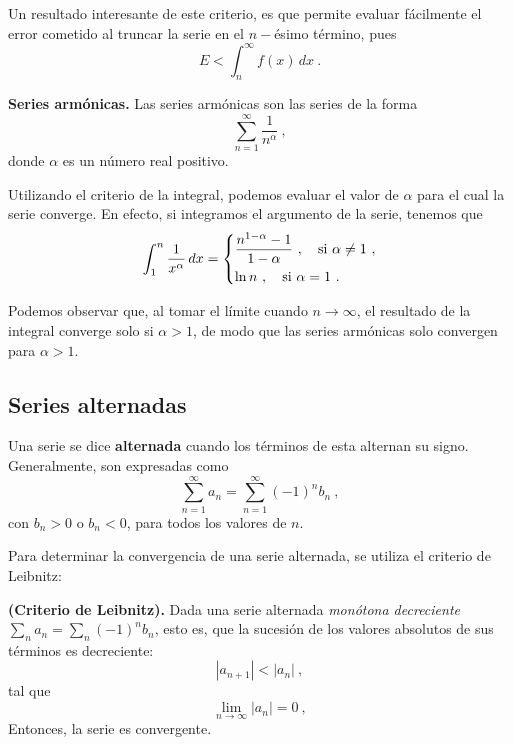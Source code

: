 Un resultado interesante de este criterio, es que permite evaluar fácilmente el error cometido al truncar la serie en el $n-$ésimo término, pues 
\begin{equation}
    E < \int_n^\infty f(x) \, dx \ .
\end{equation}

\begin{ejemplo}
    \textbf{Series armónicas.} Las series armónicas son las series de la forma 
    \begin{equation}
        \sum_{n=1}^\infty \frac{1}{n^\alpha} \ ,
    \end{equation}
    donde $\alpha$ es un número real positivo.
    
    Utilizando el criterio de la integral, podemos evaluar el valor de $\alpha$ para el cual la serie converge. En efecto, si integramos el argumento de la serie, tenemos que 
    \begin{equation*}
        \int_1^n \frac{1}{x^\alpha} \, dx = \begin{dcases}
            \dfrac{n^{1-\alpha}-1}{1-\alpha} \ , \quad \text{si } \alpha \neq 1 \ , \\
            \ln n \ , \quad \text{si } \alpha = 1 \ .
        \end{dcases}
    \end{equation*}

    Podemos observar que, al tomar el límite cuando $n\to\infty$, el resultado de la integral converge solo si $\alpha > 1$, de modo que las series armónicas solo convergen para $\alpha > 1$.
\end{ejemplo}



\subsection{Series alternadas}

\begin{defi}
    Una serie se dice \textbf{alternada} cuando los términos de esta alternan su signo. Generalmente, son expresadas como 
    \begin{equation}
        \sum_{n=1}^\infty a_n = \sum_{n=1}^\infty (-1)^n b_n \ ,
    \end{equation}
    con $b_n > 0$ o $b_n < 0$, para todos los valores de $n$.
\end{defi}

Para determinar la convergencia de una serie alternada, se utiliza el criterio de Leibnitz:
\begin{teorema}{\textbf{(Criterio de Leibnitz).}}
    Dada una serie alternada \emph{monótona decreciente} $\sum\limits_n a_n = \sum\limits_n (-1)^n b_n$, esto es, que la sucesión de los valores absolutos de sus términos es decreciente:
    \begin{equation*}
        |a_{n+1}| < |a_n| \ ,
    \end{equation*}
    tal que 
    \begin{equation*}
        \lim_{n \to \infty} |a_n| = 0 \ ,
    \end{equation*}
    Entonces, la serie es convergente.
\end{teorema}

